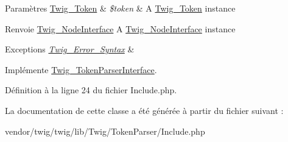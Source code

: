 \begin{DoxyParams}[1]{Paramètres}
\hyperlink{class_twig___token}{Twig\+\_\+\+Token} & {\em \$token} & A \hyperlink{class_twig___token}{Twig\+\_\+\+Token} instance\\
\hline
\end{DoxyParams}
\begin{DoxyReturn}{Renvoie}
\hyperlink{interface_twig___node_interface}{Twig\+\_\+\+Node\+Interface} A \hyperlink{interface_twig___node_interface}{Twig\+\_\+\+Node\+Interface} instance
\end{DoxyReturn}

\begin{DoxyExceptions}{Exceptions}
{\em \hyperlink{class_twig___error___syntax}{Twig\+\_\+\+Error\+\_\+\+Syntax}} & \\
\hline
\end{DoxyExceptions}


Implémente \hyperlink{interface_twig___token_parser_interface_a5dfa2e269321584fb74e8b43dabe0efd}{Twig\+\_\+\+Token\+Parser\+Interface}.



Définition à la ligne 24 du fichier Include.\+php.



La documentation de cette classe a été générée à partir du fichier suivant \+:\begin{DoxyCompactItemize}
\item 
vendor/twig/twig/lib/\+Twig/\+Token\+Parser/Include.\+php\end{DoxyCompactItemize}
